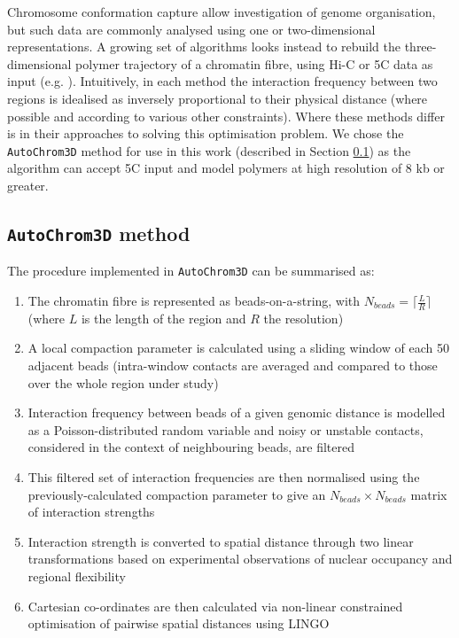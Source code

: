 \documentclass[a4paper,11pt,oneside]{book}
\begin{document}
Chromosome conformation capture allow investigation of genome organisation, but such data are commonly analysed using one or two-dimensional representations. A growing set of algorithms looks instead to rebuild the three-dimensional polymer trajectory of a chromatin fibre, using Hi-C or 5C data as input (e.g. ). Intuitively, in each method the interaction frequency between two regions is idealised as inversely proportional to their physical distance (where possible and according to various other constraints). Where these methods differ is in their approaches to solving this optimisation problem. We chose the \texttt{AutoChrom3D} method\cite{Peng2013} for use in this work (described in Section \ref{sec:achrom}) as the algorithm can accept 5C input and model polymers at high resolution of 8 kb or greater.

\subsection{\texttt{AutoChrom3D} method}\label{sec:achrom}

The procedure implemented in \texttt{AutoChrom3D} can be summarised as:\cite{Peng2013}

\begin{enumerate}
\item The chromatin fibre is represented as beads-on-a-string, with $N_{beads} = \lceil\frac{L}{R}\rceil$ (where $L$ is the length of the region and $R$ the resolution)
\item A local compaction parameter is calculated using a sliding window of each 50 adjacent beads (intra-window contacts are averaged and compared to those over the whole region under study)
\item Interaction frequency between beads of a given genomic distance is modelled as a Poisson-distributed random variable and noisy or unstable contacts, considered in the context of neighbouring beads, are filtered
\item This filtered set of interaction frequencies are then normalised using the previously-calculated compaction parameter to give an $N_{beads} \times N_{beads}$ matrix of interaction strengths
\item Interaction strength is converted to spatial distance through two linear transformations based on experimental observations of nuclear occupancy and regional flexibility\cite{Kalhor2012}
\item Cartesian co-ordinates are then calculated via non-linear constrained optimisation of pairwise spatial distances using LINGO\cite{lingo}
\end{enumerate}
\end{document}
